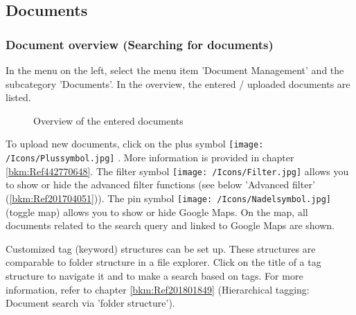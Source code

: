 \pagebreak
\subsection{Documents}
\label{bkm:Ref442273482}

\subsubsection{Document overview (Searching for documents)}
\label{bkm:Ref443047823}

In the menu on the left, select the menu item 'Document Management' and the subcategory 'Documents'. In the overview, the entered / uploaded documents are listed.

\begin{figure}[H]
\caption{Overview of the entered documents}
\end{figure}

To upload new documents, click on the plus symbol \texttt{[image: /Icons/Plussymbol.jpg]} . More information is provided in chapter \ref{bkm:Ref442770648}. The filter symbol \texttt{[image: /Icons/Filter.jpg]}  allows you to show or hide the advanced filter functions (see below 'Advanced filter' (\ref{bkm:Ref201704051})). The pin symbol \texttt{[image: /Icons/Nadelsymbol.jpg]} (toggle map)  allows you to show or hide Google Maps. On the map, all documents related to the search query and linked to Google Maps are shown.\newline

Customized tag (keyword) structures can be set up. These structures are comparable to folder structure in a file explorer. Click on the title of a tag structure  to navigate it and to make a search based on tags. For more information, refer to chapter \ref{bkm:Ref201801849} (Hierarchical tagging: Document search via 'folder structure'). \newline

